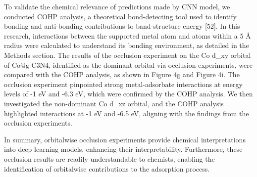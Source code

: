 To validate the chemical relevance of predictions made by CNN model, we conducted COHP analysis, a theoretical bond-detecting tool used to identify bonding and anti-bonding contributions to band-structure energy [52]. In this research, interactions between the supported metal atom and atoms within a 5 Å radius were calculated to understand its bonding environment, as detailed in the Methods section. The results of the occlusion experiment on the Co d_xy orbital of Co@g-C3N4, identified as the dominant orbital via occlusion experiments, were compared with the COHP analysis, as shown in Figure 4g and Figure 4i. The occlusion experiment pinpointed strong metal-adsorbate interactions at energy levels of -1 eV and -6.3 eV, which were confirmed by the COHP analysis. We then investigated the non-dominant Co d_xz orbital, and the COHP analysis highlighted interactions at -1 eV and -6.5 eV, aligning with the findings from the occlusion experiments.

In summary, orbitalwise occlusion experiments provide chemical interpretations into deep learning models, enhancing their interpretability. Furthermore, these occlusion results are readily understandable to chemists, enabling the identification of orbitalwise contributions to the adsorption process.
